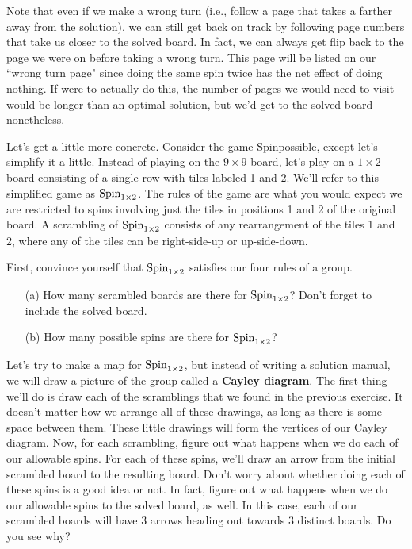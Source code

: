 Note that even if we make a wrong turn (i.e., follow a page that takes a farther away from the solution), we can still get back on track by following page numbers that take us closer to the solved board.  In fact, we can always get flip back to the page we were on before taking a wrong turn.  This page will be listed on our ``wrong turn page" since doing the same spin twice has the net effect of doing nothing.  If were to actually do this, the number of pages we would need to visit would be longer than an optimal solution, but we'd get to the solved board nonetheless.

Let's get a little more concrete.  Consider the game Spinpossible, except let's simplify it a little.  Instead of playing on the $9\times 9$ board, let's play on a $1\times 2$ board consisting of a single row with tiles labeled 1 and 2.  We'll refer to this simplified game as $\operatorname{Spin}_{1\times 2}$.  The rules of the game are what you would expect we are restricted to spins involving just the tiles in positions 1 and 2 of the original board.  A scrambling of $\operatorname{Spin}_{1\times 2}$ consists of any rearrangement of the tiles 1 and 2, where any of the tiles can be right-side-up or up-side-down.

\begin{exercise}
First, convince yourself that $\operatorname{Spin}_{1\times 2}$ satisfies our four rules of a group.
\begin{enumerate}
\item[(a)] How many scrambled boards are there for $\operatorname{Spin}_{1\times 2}$?  Don't forget to include the solved board.
\item[(b)] How many possible spins are there for $\operatorname{Spin}_{1\times 2}$?
\end{enumerate}
\end{exercise}

Let's try to make a map for $\operatorname{Spin}_{1\times 2}$, but instead of writing a solution manual, we will draw a picture of the group called a \textbf{Cayley diagram}.  The first thing we'll do is draw each of the scramblings that we found in the previous exercise.  It doesn't matter how we arrange all of these drawings, as long as there is some space between them.  These little drawings will form the vertices of our Cayley diagram.  Now, for each scrambling, figure out what happens when we do each of our allowable spins.  For each of these spins, we'll draw an arrow from the initial scrambled board to the resulting board.  Don't worry about whether doing each of these spins is a good idea or not.  In fact, figure out what happens when we do our allowable spins to the solved board, as well.  In this case, each of our scrambled boards will have 3 arrows heading out towards 3 distinct boards.  Do you see why?  

